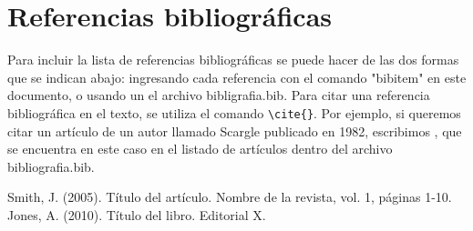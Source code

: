 \documentclass[a4paper,alpha-refs]{eSpectra}
\begin{document}
\section*{Referencias bibliográficas}
Para incluir la lista de referencias bibliográficas se puede hacer de las dos formas que se indican abajo: ingresando cada referencia con el comando "bibitem" en este documento, o usando un el archivo bibligrafia.bib.
Para citar una referencia bibliográfica en el texto, se utiliza el comando \verb|\cite{}|. Por ejemplo, si queremos citar un artículo de un autor llamado Scargle publicado en 1982, escribimos \cite{scargle_1982}, que se encuentra en este caso en el listado de artículos dentro del archivo bibliografia.bib.

\begin{thebibliography}{}
    Smith, J. (2005). Título del artículo. Nombre de la revista, vol. 1, páginas 1-10.
    Jones, A. (2010). Título del libro. Editorial X.
\end{thebibliography}



\end{document}

